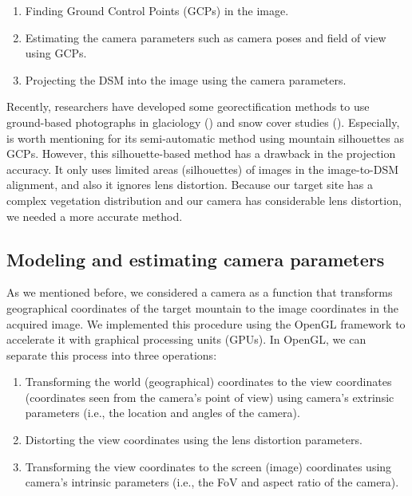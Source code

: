 \documentclass{article}
\providecommand{\tightlist}{%
  \setlength{\itemsep}{0pt}\setlength{\parskip}{0pt}}
\begin{document}
\begin{enumerate}
\def\labelenumi{\arabic{enumi}.}
\tightlist
\item
  Finding Ground Control Points (GCPs) in the image.\\
\item
  Estimating the camera parameters such as camera poses and field of view using GCPs.\\
\item
  Projecting the DSM into the image using the camera parameters.
\end{enumerate}

Recently, researchers have developed some georectification methods to use ground-based photographs in glaciology (\cite{Messerli2015GeoInst}) and snow cover studies (\cite{Portenier2020Cryosphere}). Especially, \cite{Portenier2020Cryosphere} is worth mentioning for its semi-automatic method using mountain silhouettes as GCPs. However, this silhouette-based method has a drawback in the projection accuracy. It only uses limited areas (silhouettes) of images in the image-to-DSM alignment, and also it ignores lens distortion. Because our target site has a complex vegetation distribution and our camera has considerable lens distortion, we needed a more accurate method.

\hypertarget{modeling-and-estimating-camera-parameters}{%
\subsection{Modeling and estimating camera parameters}\label{modeling-and-estimating-camera-parameters}}

As we mentioned before, we considered a camera as a function that transforms geographical coordinates of the target mountain to the image coordinates in the acquired image. We implemented this procedure using the OpenGL framework to accelerate it with graphical processing units (GPUs). In OpenGL, we can separate this process into three operations:

\begin{enumerate}
\def\labelenumi{\arabic{enumi}.}
\tightlist
\item
  Transforming the world (geographical) coordinates to the view coordinates (coordinates seen from the camera's point of view) using camera's extrinsic parameters (i.e., the location and angles of the camera).\\
\item
  Distorting the view coordinates using the lens distortion parameters.\\
\item
  Transforming the view coordinates to the screen (image) coordinates using camera's intrinsic parameters (i.e., the FoV and aspect ratio of the camera).
\end{enumerate}
\end{document}
